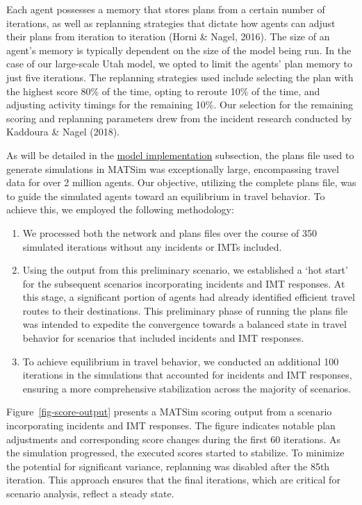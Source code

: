 \documentclass[fancy, oneside, mastersfancy, ms]{byuthesis}
\providecommand{\tightlist}{%
  \setlength{\itemsep}{0pt}\setlength{\parskip}{0pt}}\usepackage{longtable,booktabs,array}
\begin{document}
Each agent possesses a memory that stores plans from a certain number of
iterations, as well as replanning strategies that dictate how agents can
adjust their plans from iteration to iteration (Horni \& Nagel, 2016).
The size of an agent's memory is typically dependent on the size of the
model being run. In the case of our large-scale Utah model, we opted to
limit the agents' plan memory to just five iterations. The replanning
strategies used include selecting the plan with the highest score 80\%
of the time, opting to reroute 10\% of the time, and adjusting activity
timings for the remaining 10\%. Our selection for the remaining scoring
and replanning parameters drew from the incident research conducted by
Kaddoura \& Nagel (2018).

As will be detailed in the \protect\hyperlink{sec-model_imp}{model
implementation} subsection, the plans file used to generate simulations
in MATSim was exceptionally large, encompassing travel data for over 2
million agents. Our objective, utilizing the complete plans file, was to
guide the simulated agents toward an equilibrium in travel behavior. To
achieve this, we employed the following methodology:

\begin{enumerate}
\def\labelenumi{\arabic{enumi}.}
\tightlist
\item
  We processed both the network and plans files over the course of 350
  simulated iterations without any incidents or IMTs included.
\item
  Using the output from this preliminary scenario, we established a `hot
  start' for the subsequent scenarios incorporating incidents and IMT
  responses. At this stage, a significant portion of agents had already
  identified efficient travel routes to their destinations. This
  preliminary phase of running the plans file was intended to expedite
  the convergence towards a balanced state in travel behavior for
  scenarios that included incidents and IMT responses.
\item
  To achieve equilibrium in travel behavior, we conducted an additional
  100 iterations in the simulations that accounted for incidents and IMT
  responses, ensuring a more comprehensive stabilization across the
  majority of scenarios.
\end{enumerate}

Figure~\ref{fig-score-output} presents a MATSim scoring output from a
scenario incorporating incidents and IMT responses. The figure indicates
notable plan adjustments and corresponding score changes during the
first 60 iterations. As the simulation progressed, the executed scores
started to stabilize. To minimize the potential for significant
variance, replanning was disabled after the 85th iteration. This
approach ensures that the final iterations, which are critical for
scenario analysis, reflect a steady state.
\end{document}
